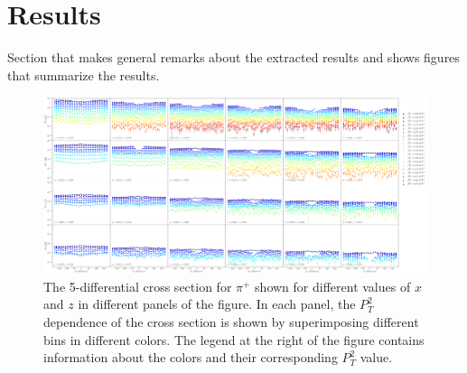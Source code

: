 \section{Results}
Section that makes general remarks about the extracted results and shows figures that summarize the results.

\begin{figure}
  \centering
  \includegraphics[width=\textwidth]{image/plots/sidis/pip_cross_section_x_z.pdf}
  \caption[$d^5\sigma$ for $\pi^+$]{The 5-differential cross section for $\pi^+$ shown for different values of $x$ and $z$ in different panels of the figure.  In each panel, the $P_T^2$ dependence of the cross section is shown by superimposing different bins in different colors.  The legend at the right of the figure contains information about the colors and their corresponding $P_T^2$ value.}
    \label{fig:cross-section-pip}

\end{figure}
